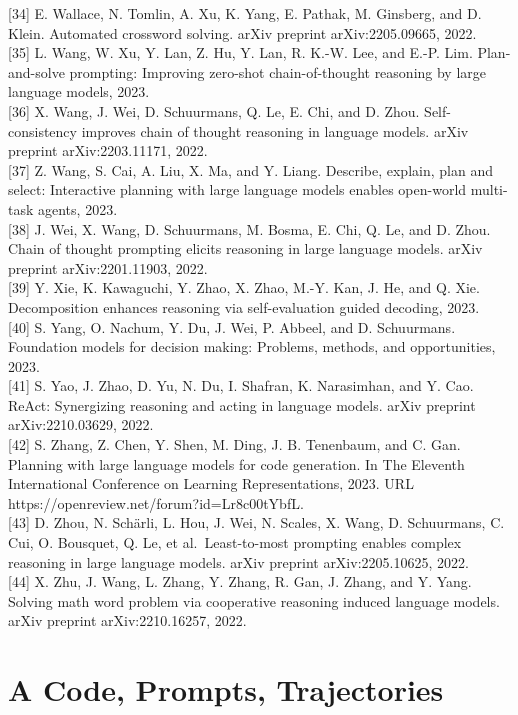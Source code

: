 \documentclass[
]{article}
\begin{document}
{[}34{]} E. Wallace, N. Tomlin, A. Xu, K. Yang, E. Pathak, M. Ginsberg,
and D. Klein. Automated crossword solving. arXiv preprint
arXiv:2205.09665, 2022.\\
{[}35{]} L. Wang, W. Xu, Y. Lan, Z. Hu, Y. Lan, R. K.-W. Lee, and E.-P.
Lim. Plan-and-solve prompting: Improving zero-shot chain-of-thought
reasoning by large language models, 2023.\\
{[}36{]} X. Wang, J. Wei, D. Schuurmans, Q. Le, E. Chi, and D. Zhou.
Self-consistency improves chain of thought reasoning in language models.
arXiv preprint arXiv:2203.11171, 2022.\\
{[}37{]} Z. Wang, S. Cai, A. Liu, X. Ma, and Y. Liang. Describe,
explain, plan and select: Interactive planning with large language
models enables open-world multi-task agents, 2023.\\
{[}38{]} J. Wei, X. Wang, D. Schuurmans, M. Bosma, E. Chi, Q. Le, and D.
Zhou. Chain of thought prompting elicits reasoning in large language
models. arXiv preprint arXiv:2201.11903, 2022.\\
{[}39{]} Y. Xie, K. Kawaguchi, Y. Zhao, X. Zhao, M.-Y. Kan, J. He, and
Q. Xie. Decomposition enhances reasoning via self-evaluation guided
decoding, 2023.\\
{[}40{]} S. Yang, O. Nachum, Y. Du, J. Wei, P. Abbeel, and D.
Schuurmans. Foundation models for decision making: Problems, methods,
and opportunities, 2023.\\
{[}41{]} S. Yao, J. Zhao, D. Yu, N. Du, I. Shafran, K. Narasimhan, and
Y. Cao. ReAct: Synergizing reasoning and acting in language models.
arXiv preprint arXiv:2210.03629, 2022.\\
{[}42{]} S. Zhang, Z. Chen, Y. Shen, M. Ding, J. B. Tenenbaum, and C.
Gan. Planning with large language models for code generation. In The
Eleventh International Conference on Learning Representations, 2023. URL
https://openreview.net/forum?id=Lr8c00tYbfL.\\
{[}43{]} D. Zhou, N. Schärli, L. Hou, J. Wei, N. Scales, X. Wang, D.
Schuurmans, C. Cui, O. Bousquet, Q. Le, et al.~Least-to-most prompting
enables complex reasoning in large language models. arXiv preprint
arXiv:2205.10625, 2022.\\
{[}44{]} X. Zhu, J. Wang, L. Zhang, Y. Zhang, R. Gan, J. Zhang, and Y.
Yang. Solving math word problem via cooperative reasoning induced
language models. arXiv preprint arXiv:2210.16257, 2022.

\section{A Code, Prompts,
Trajectories}\label{a-code-prompts-trajectories}
\end{document}
